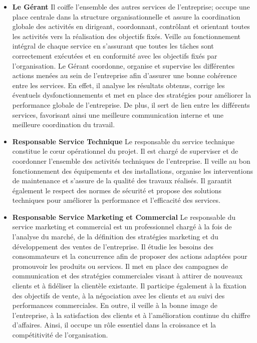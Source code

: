 \begin{itemize}
        
    \item \textbf{Le Gérant}
    Il coiffe l'ensemble des autres services de l'entreprise; occupe une place centrale dans la structure organisationnelle et assure la coordination globale des activités en dirigeant, coordonnant, contrôlant et orientant toutes les activités vers la réalisation des objectifs fixés. Veille au fonctionnement intégral de chaque service en s'assurant que toutes les tâches sont correctement exécutées et en conformité avec les objectifs fixés par l'organisation. Le Gérant coordonne, organise et supervise les différentes actions menées au sein de l'entreprise afin d'assurer une bonne cohérence entre les services. En effet, il analyse les résultats obtenus, corrige les éventuels dysfonctionnements et met en place des stratégies pour améliorer la performance globale de l'entreprise. De plus, il sert de lien entre les différents services, favorisant ainsi une meilleure communication interne et une meilleure coordination du travail.

    \item \textbf{Responsable Service Technique}
    Le responsable du service technique constitue le cœur opérationnel du projet. Il est chargé de superviser et de coordonner l'ensemble des activités techniques de l'entreprise. Il veille au bon fonctionnement des équipements et des installations, organise les interventions de maintenance et s'assure de la qualité des travaux réalisés. Il garantit également le respect des normes de sécurité et propose des solutions techniques pour améliorer la performance et l'efficacité des services.

    \item \textbf{Responsable Service Marketing et Commercial}
    Le responsable du service marketing et commercial est un professionnel chargé à la fois de l'analyse du marché, de la définition des stratégies marketing et du développement des ventes de l'entreprise. Il étudie les besoins des consommateurs et la concurrence afin de proposer des actions adaptées pour promouvoir les produits ou services.
    Il met en place des campagnes de communication et des stratégies commerciales visant à attirer de nouveaux clients et à fidéliser la clientèle existante. Il participe également à la fixation des objectifs de vente, à la négociation avec les clients et au suivi des performances commerciales.
    En outre, il veille à la bonne image de l'entreprise, à la satisfaction des clients et à l'amélioration continue du chiffre d'affaires. Ainsi, il occupe un rôle essentiel dans la croissance et la compétitivité de l'organisation.


\end{itemize}
